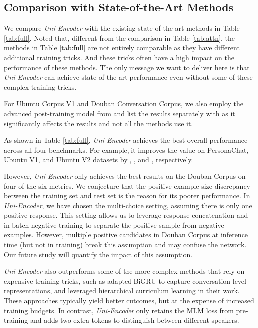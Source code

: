 \subsection{Comparison with State-of-the-Art Methods} \label{results}


We compare \textit{Uni-Encoder} with the existing state-of-the-art methods in Table \ref{tab:full}. Noted that, different from the comparison in Table \ref{tab:attn}, the methods in Table \ref{tab:full} are not entirely comparable as they have different additional training tricks. And these tricks often have a high impact on the performance of these methods. The only message we want to deliver here is that \textit{Uni-Encoder} can achieve state-of-the-art performance even without some of these complex training tricks.



For Ubuntu Corpus V1 and Douban Conversation Corpus, we also employ the advanced post-training model from \citet{han2021fine} and list the results separately with  as it significantly affects the results and not all the methods use it.  



As shown in Table \ref{tab:full}, \textit{Uni-Encoder} achieves the best overall performance across all four benchmarks. For example, it improves the  value on PersonaChat, Ubuntu V1, and Ubuntu V2 datasets by , , and , respectively.


However, \textit{Uni-Encoder} only achieves the best results on the Douban Corpus on four of the six metrics. We conjecture that the positive example size discrepancy between the training set and test set is the reason for its poorer performance. In \textit{Uni-Encoder}, we have chosen the multi-choice setting, assuming there is only one positive response. This setting allows us to leverage response concatenation and in-batch negative training to separate the positive sample from negative examples. However, multiple positive candidates in Douban Corpus at inference time (but not in training) break this assumption and may confuse the network. Our future study will quantify the impact of this assumption. 



\textit{Uni-Encoder} also outperforms some of the more complex methods that rely on expensive training tricks, such as \citet{liu2021filling} adapted BiGRU to capture conversation-level representations, and \citet{su2020dialogue} leveraged hierarchical curriculum learning in their work. These approaches typically yield better outcomes, but at the expense of increased training budgets. In contrast, \textit{Uni-Encoder} only retains the MLM loss from pre-training and adds two extra tokens to distinguish between different speakers.





